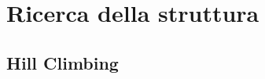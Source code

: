 \section{Ricerca della struttura}\label{sec:ctbn-graph-search}
\omissis{}

\subsection{Hill Climbing}\label{sec:hc}
\omissis{}




